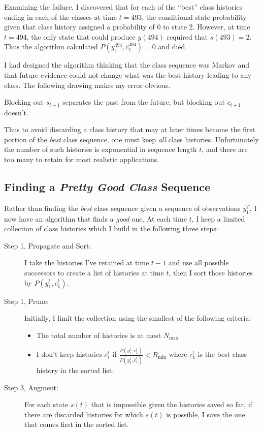 \documentclass[prelim,showlabels]{book}
\begin{document}
Examining the failure, I discovered that for each of the ``best''
class histories ending in each of the classes at time $t=493$, the
conditional state probability given that class history assigned a
probability of 0 to state 2.  However, at time $t=494$, the only state
that could produce $y(494)$ required that $s(493)=2$.  Thus the
algorithm calculated $P(y_1^{494}, \hat c_1^{494}) = 0$ and died.

I had designed the algorithm thinking that the class sequence was
Markov and that future evidence could not change what was the best
history leading to any class.  The following drawing makes my error
obvious.
\begin{center}
  \resizebox{0.75\columnwidth}{!}{}
\end{center}
Blocking out $s_{t+1}$ separates the past from the future, but
blocking out $c_{t+1}$ doesn't.

Thus to avoid discarding a class history that may at later times
become the first portion of the \emph{best} class sequence, one must
keep \emph{all} class histories.  Unfortunately the number of such
histories is exponential in sequence length $t$, and there are too
many to retain for most realistic applications.
\subsection{Finding a \emph{Pretty Good Class} Sequence}
\label{sec:prettygood}

Rather than finding the \emph{best} class sequence given a sequence of
observations $y_1^T$, I now have an algorithm that finds a \emph{good}
one.  At each time $t$, I keep a limited collection of class histories
which I build in the following three steps:
\begin{description}
\item[Step 1, Propagate and Sort:] I take the histories I've retained
  at time $t-1$ and use all possible successors to create a list of
  histories at time $t$, then I sort those histories by
  $P(y_1^{t},c_1^{t})$.
\item[Step 1, Prune:] Initially, I limit the collection using the
  smallest of the following criteria:
  \begin{itemize}
  \item The total number of histories is at most $N_{\text{max}}$
  \item I don't keep histories $c_1^t$ if
    $\frac{P(y_1^{t},c_1^{t})}{P(y_1^{t},\bar c_1^{t})} <
    R_{\text{min}}$ where $\bar c_1^t$ is the best class history in
    the sorted list.
  \end{itemize}
\item[Step 3, Augment:] For each state $s(t)$ that is impossible given
  the histories saved so far, if there are discarded histories for
  which $s(t)$ is possible, I save the one that comes first in the
  sorted list.
\end{description}
\end{document}
